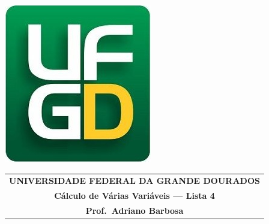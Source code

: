 \documentclass[a4paper,5pt]{amsbook}
\begin{document}
\thispagestyle{empty}
\pagestyle{empty}
\begin{minipage}[h]{0.14\textwidth}
	\includegraphics[scale=0.24]{../../ufgd.png}
\end{minipage}
\begin{minipage}[h]{\textwidth}
\begin{tabular}{c}
{{\bf UNIVERSIDADE FEDERAL DA GRANDE DOURADOS}}\\
{{\bf C\'alculo de V\'arias Vari\'aveis --- Lista 4}}\\
{{\bf Prof.\ Adriano Barbosa}}\\
\end{tabular}
\vspace{-0.45cm}
%
\end{minipage}

\end{document}
